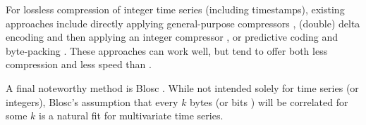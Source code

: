 For lossless compression of integer time series (including timestamps), existing approaches include directly applying general-purpose compressors \cite{respawnDB, openTSDB, chronicleDB, kairosDB, druid}, (double) delta encoding and then applying an integer compressor \cite{influxDB, gorilla}, or predictive coding and byte-packing \cite{akumuli}. These approaches can work well, but tend to offer both less compression and less speed than \mine.

A final noteworthy method is Blosc \cite{blosc}. While not intended solely for time series (or integers), Blosc's assumption that every $k$ bytes (or bits \cite{bitshuf}) will be correlated for some $k$ is a natural fit for multivariate time series. %


